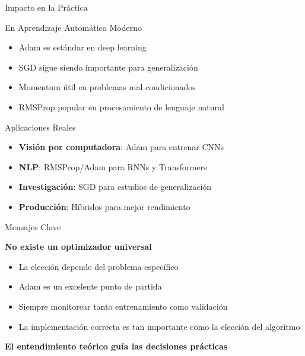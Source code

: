 \documentclass[10pt]{beamer}
\begin{document}
\begin{frame}{Impacto en la Práctica}
\begin{block}{En Aprendizaje Automático Moderno}
\begin{itemize}
\item Adam es estándar en deep learning
\item SGD sigue siendo importante para generalización
\item Momentum útil en problemas mal condicionados
\item RMSProp popular en procesamiento de lenguaje natural
\end{itemize}
\end{block}

\begin{exampleblock}{Aplicaciones Reales}
\begin{itemize}
\item \textbf{Visión por computadora}: Adam para entrenar CNNs
\item \textbf{NLP}: RMSProp/Adam para RNNs y Transformers
\item \textbf{Investigación}: SGD para estudios de generalización
\item \textbf{Producción}: Híbridos para mejor rendimiento
\end{itemize}
\end{exampleblock}
\end{frame}

\begin{frame}{Mensajes Clave}
\begin{center}
\Large
\textbf{No existe un optimizador universal}
\end{center}

\vspace{0.5cm}

\begin{itemize}
\item La elección depende del problema específico
\item Adam es un excelente punto de partida
\item Siempre monitorear tanto entrenamiento como validación
\item La implementación correcta es tan importante como la elección del algoritmo
\end{itemize}

\vspace{0.5cm}

\begin{center}
\textcolor{azulUni}{\textbf{El entendimiento teórico guía las decisiones prácticas}}
\end{center}
\end{frame}
\end{document}
